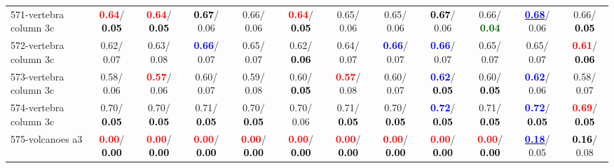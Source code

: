 \begin{table}[h]
\begin{center}
{\begin{tabular}{lc|c|c|c|c|c|c|c|c|c|c}
571-vertebra column 3c & \textcolor{red}{\textbf{  0.64}}/\textcolor{black}{\textbf{  0.05}} & \textcolor{red}{\textbf{  0.64}}/\textcolor{black}{\textbf{  0.05}} & \textcolor{black}{\textbf{  0.67}}/  0.06 &   0.66/  0.06 & \textcolor{red}{\textbf{  0.64}}/\textcolor{black}{\textbf{  0.05}} &   0.65/  0.06 &   0.65/  0.06 & \textcolor{black}{\textbf{  0.67}}/  0.06 &   0.66/\textcolor{darkgreen}{\textbf{  0.04}} & \underline{\textcolor{blue}{\textbf{  0.68}}}/  0.06 &   0.66/\textcolor{black}{\textbf{  0.05}} \\
572-vertebra column 3c &   0.62/  0.07 &   0.63/  0.08 & \textcolor{blue}{\textbf{  0.66}}/  0.07 &   0.65/  0.07 &   0.62/\textcolor{black}{\textbf{  0.06}} &   0.64/  0.07 & \textcolor{blue}{\textbf{  0.66}}/  0.07 & \textcolor{blue}{\textbf{  0.66}}/  0.07 &   0.65/  0.07 &   0.65/  0.07 & \textcolor{red}{\textbf{  0.61}}/\textcolor{black}{\textbf{  0.06}} \\ \hline
573-vertebra column 3c &   0.58/  0.06 & \textcolor{red}{\textbf{  0.57}}/  0.06 &   0.60/  0.07 &   0.59/  0.08 &   0.60/\textcolor{black}{\textbf{  0.05}} & \textcolor{red}{\textbf{  0.57}}/  0.08 &   0.60/  0.07 & \textcolor{blue}{\textbf{  0.62}}/\textcolor{black}{\textbf{  0.05}} &   0.60/\textcolor{black}{\textbf{  0.05}} & \textcolor{blue}{\textbf{  0.62}}/  0.06 &   0.58/  0.07 \\
574-vertebra column 3c &   0.70/\textcolor{black}{\textbf{  0.05}} &   0.70/\textcolor{black}{\textbf{  0.05}} &   0.71/\textcolor{black}{\textbf{  0.05}} &   0.70/\textcolor{black}{\textbf{  0.05}} &   0.70/  0.06 &   0.71/\textcolor{black}{\textbf{  0.05}} &   0.70/\textcolor{black}{\textbf{  0.05}} & \textcolor{blue}{\textbf{  0.72}}/\textcolor{black}{\textbf{  0.05}} &   0.71/\textcolor{black}{\textbf{  0.05}} & \textcolor{blue}{\textbf{  0.72}}/\textcolor{black}{\textbf{  0.05}} & \textcolor{red}{\textbf{  0.69}}/\textcolor{black}{\textbf{  0.05}} \\
575-volcanoes a3 & \textcolor{red}{\textbf{  0.00}}/\textcolor{black}{\textbf{  0.00}} & \textcolor{red}{\textbf{  0.00}}/\textcolor{black}{\textbf{  0.00}} & \textcolor{red}{\textbf{  0.00}}/\textcolor{black}{\textbf{  0.00}} & \textcolor{red}{\textbf{  0.00}}/\textcolor{black}{\textbf{  0.00}} & \textcolor{red}{\textbf{  0.00}}/\textcolor{black}{\textbf{  0.00}} & \textcolor{red}{\textbf{  0.00}}/\textcolor{black}{\textbf{  0.00}} & \textcolor{red}{\textbf{  0.00}}/\textcolor{black}{\textbf{  0.00}} & \textcolor{red}{\textbf{  0.00}}/\textcolor{black}{\textbf{  0.00}} & \textcolor{red}{\textbf{  0.00}}/\textcolor{black}{\textbf{  0.00}} & \underline{\textcolor{blue}{\textbf{  0.18}}}/  0.05 & \textcolor{black}{\textbf{  0.16}}/  0.08 \\

\end{tabular}}
\end{center}
\end{table}
